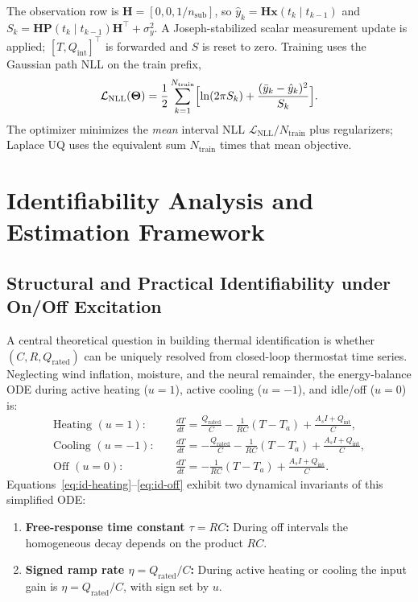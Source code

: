 \documentclass[11pt,letterpaper]{article}
\begin{document}
The observation row is $\bm{H} = [0, 0, 1/n_\mathrm{sub}]$, so $\hat{y}_k = \bm{H}\bm{x}(t_k\mid t_{k-1})$ and $S_k = \bm{H}\bm{P}(t_k\mid t_{k-1})\bm{H}^\top + \sigma_y^2$. A Joseph-stabilized scalar measurement update is applied; $[T, Q_\mathrm{int}]^\top$ is forwarded and $S$ is reset to zero. Training uses the Gaussian path NLL on the train prefix,
\begin{equation}
\label{eq:nll}
\mathcal{L}_\mathrm{NLL}(\bm{\Theta}) = \frac{1}{2}\sum_{k=1}^{N_\mathrm{train}} \Bigl[ \ln(2\pi S_k) + \frac{(\bar{y}_k - \hat{y}_k)^2}{S_k} \Bigr].
\end{equation}
The optimizer minimizes the \emph{mean} interval NLL $\mathcal{L}_\mathrm{NLL}/N_\mathrm{train}$ plus regularizers; Laplace UQ uses the equivalent sum $N_\mathrm{train}$ times that mean objective.

\section{Identifiability Analysis and Estimation Framework}
\label{sec:id}

\subsection{Structural and Practical Identifiability under On/Off Excitation}
\label{sec:id-analysis}
A central theoretical question in building thermal identification is whether $(C, R, Q_\mathrm{rated})$ can be uniquely resolved from closed-loop thermostat time series. Neglecting wind inflation, moisture, and the neural remainder, the energy-balance ODE during active heating ($u = 1$), active cooling ($u = -1$), and idle/off ($u = 0$) is:
\begin{align}
\label{eq:id-heating}
\text{Heating } (u=1): \quad &\frac{dT}{dt} = \frac{Q_\mathrm{rated}}{C} - \frac{1}{RC}(T - T_a) + \frac{A_s I + Q_\mathrm{int}}{C}, \\
\label{eq:id-cooling}
\text{Cooling } (u=-1): \quad &\frac{dT}{dt} = -\frac{Q_\mathrm{rated}}{C} - \frac{1}{RC}(T - T_a) + \frac{A_s I + Q_\mathrm{int}}{C}, \\
\label{eq:id-off}
\text{Off } (u=0): \quad &\frac{dT}{dt} = -\frac{1}{RC}(T - T_a) + \frac{A_s I + Q_\mathrm{int}}{C}.
\end{align}
Equations~\eqref{eq:id-heating}--\eqref{eq:id-off} exhibit two dynamical invariants of this simplified ODE:
\begin{enumerate}
\item \textbf{Free-response time constant $\tau = RC$:} During off intervals the homogeneous decay depends on the product $RC$.
\item \textbf{Signed ramp rate $\eta = Q_\mathrm{rated}/C$:} During active heating or cooling the input gain is $\eta = Q_\mathrm{rated}/C$, with sign set by $u$.
\end{enumerate}
\end{document}
